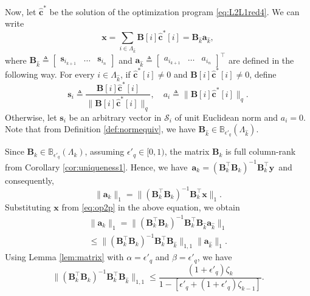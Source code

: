 \documentclass[10pt,twocolumn,twoside] {IEEEtran}
\begin{document}
{Now, let $\widehat{\boldsymbol{c}}^*$ be the solution of the optimization program \eqref{eq:L2L1red4}. We can write
\begin{equation}
\label{eq:op2p}
{{\mathbf x}} = \sum_{i \in \Lambda_{\widehat{k}}} {\boldsymbol{B}}[i] \widehat{\boldsymbol{c}}^*[i] = {\boldsymbol{B}}_{\widehat{k}} {\boldsymbol{a}}_{\widehat{k}},
\end{equation}
where ${\boldsymbol{B}}_{\widehat{k}} \triangleq \begin{bmatrix} {\boldsymbol{s}}_{i_{k+1}} \!\!& \ldots \!\!& {\boldsymbol{s}}_{i_n} \end{bmatrix}$ and ${\boldsymbol{a}}_{\widehat{k}} \triangleq \begin{bmatrix} a_{i_{k+1}} \!\!& \ldots \!\!& a_{i_n} \end{bmatrix}^{\top}$ are defined in the following way. For every $i \in \Lambda_{\widehat{k}}$, if $\widehat{\boldsymbol{c}}^*[i] \neq 0$ and ${\boldsymbol{B}}[i] \widehat{\boldsymbol{c}}^*[i] \neq 0$, define 
\begin{equation}
{\boldsymbol{s}}_i \triangleq \frac{{\boldsymbol{B}}[i] \widehat{\boldsymbol{c}}^*[i]}{ \| {\boldsymbol{B}}[i] \widehat{\boldsymbol{c}}^*[i] \|_q }, \quad a_i \triangleq \| {\boldsymbol{B}}[i] \widehat{\boldsymbol{c}}^*[i] \|_q. 
\end{equation}
Otherwise, let ${\boldsymbol{s}}_i$ be an arbitrary vector in $\mathcal{S}_i$ of unit Euclidean norm and $a_i = 0$. 
Note that from Definition \ref{def:normequiv}, we have ${\boldsymbol{B}}_{\widehat{k}} \in \mathbb{B}_{\epsilon'_q}(\Lambda_{\widehat{k}})$.

Since ${\boldsymbol{B}}_k \in \mathbb{B}_{\epsilon'_q}(\Lambda_k)$, assuming $\epsilon'_q \in [0,1)$, the matrix ${\boldsymbol{B}}_k$ is full column-rank from Corollary \ref{cor:uniqueness1}. Hence, we have $\, {\boldsymbol{a}}_k = ({\boldsymbol{B}}_k^{\top} {\boldsymbol{B}}_k)^{-1}{\boldsymbol{B}}_k^{\top} {\boldsymbol{y}} \,$ and consequently,
\begin{equation}
\| {\boldsymbol{a}}_k \|_1 = \| ({\boldsymbol{B}}_k^{\top} {\boldsymbol{B}}_k)^{-1} {\boldsymbol{B}}_k^{\top} {{\mathbf x}} \|_1.
\end{equation}
Substituting ${{\mathbf x}}$ from \eqref{eq:op2p} in the above equation, we obtain
\begin{multline}
\label{eq:interm1p}
\| {\boldsymbol{a}}_k \|_1 = \| ({\boldsymbol{B}}_k^{\top} {\boldsymbol{B}}_k)^{-1} {\boldsymbol{B}}_k^{\top} {\boldsymbol{B}}_{\widehat{k}} {\boldsymbol{a}}_{\widehat{k}} \|_1 \\ \leq \| ({\boldsymbol{B}}_k^{\top} {\boldsymbol{B}}_k)^{-1}{\boldsymbol{B}}_k^{\top} {\boldsymbol{B}}_{\widehat{k}} \|_{1,1} \| {\boldsymbol{a}}_{\widehat{k}} \|_1.
\end{multline}
Using Lemma \ref{lem:matrix} with $\alpha = \epsilon'_q$ and $\beta = \epsilon'_q$, we have 
\begin{equation}
\| ( {\boldsymbol{B}}_k^{\top} {\boldsymbol{B}}_k)^{-1} {\boldsymbol{B}}_k^{\top} {\boldsymbol{B}}_{\widehat{k}} \|_{1,1} \leq \frac{ (1 + \epsilon'_q) \zeta_k }{ 1 - [ \epsilon'_q + (1+\epsilon'_q) \zeta_{k-1}] } .
\end{equation}

}
\end{document}
